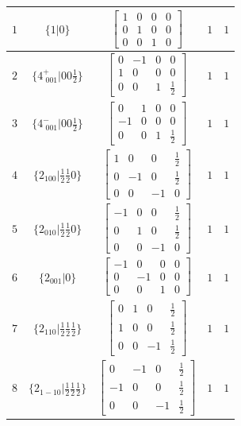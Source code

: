 \documentclass[fleqn,8pt]{jsarticle}
\begin{document}
\begin{longtable}{ccccc}
$ 1 $ & $ \{1|0\} $ & $ \begin{bmatrix} 1 & 0 & 0 & 0 \\ 0 & 1 & 0 & 0 \\ 0 & 0 & 1 & 0 \end{bmatrix} $ & $ 1 $ & $ 1 $ \\ \hline
$ 2 $ & $ \{4^{+}_{\,\,001}|0 0 \frac{1}{2}\} $ & $ \begin{bmatrix} 0 & -1 & 0 & 0 \\ 1 & 0 & 0 & 0 \\ 0 & 0 & 1 & \frac{1}{2} \end{bmatrix} $ & $ 1 $ & $ 1 $ \\ \hline
$ 3 $ & $ \{4^{-}_{\,\,001}|0 0 \frac{1}{2}\} $ & $ \begin{bmatrix} 0 & 1 & 0 & 0 \\ -1 & 0 & 0 & 0 \\ 0 & 0 & 1 & \frac{1}{2} \end{bmatrix} $ & $ 1 $ & $ 1 $ \\ \hline
$ 4 $ & $ \{2{}_{100}|\frac{1}{2} \frac{1}{2} 0\} $ & $ \begin{bmatrix} 1 & 0 & 0 & \frac{1}{2} \\ 0 & -1 & 0 & \frac{1}{2} \\ 0 & 0 & -1 & 0 \end{bmatrix} $ & $ 1 $ & $ 1 $ \\ \hline
$ 5 $ & $ \{2{}_{010}|\frac{1}{2} \frac{1}{2} 0\} $ & $ \begin{bmatrix} -1 & 0 & 0 & \frac{1}{2} \\ 0 & 1 & 0 & \frac{1}{2} \\ 0 & 0 & -1 & 0 \end{bmatrix} $ & $ 1 $ & $ 1 $ \\ \hline
$ 6 $ & $ \{2{}_{001}|0\} $ & $ \begin{bmatrix} -1 & 0 & 0 & 0 \\ 0 & -1 & 0 & 0 \\ 0 & 0 & 1 & 0 \end{bmatrix} $ & $ 1 $ & $ 1 $ \\ \hline
$ 7 $ & $ \{2{}_{110}|\frac{1}{2} \frac{1}{2} \frac{1}{2}\} $ & $ \begin{bmatrix} 0 & 1 & 0 & \frac{1}{2} \\ 1 & 0 & 0 & \frac{1}{2} \\ 0 & 0 & -1 & \frac{1}{2} \end{bmatrix} $ & $ 1 $ & $ 1 $ \\ \hline
$ 8 $ & $ \{2{}_{1-10}|\frac{1}{2} \frac{1}{2} \frac{1}{2}\} $ & $ \begin{bmatrix} 0 & -1 & 0 & \frac{1}{2} \\ -1 & 0 & 0 & \frac{1}{2} \\ 0 & 0 & -1 & \frac{1}{2} \end{bmatrix} $ & $ 1 $ & $ 1 $ \\ \hline

\end{longtable}
\end{document}
